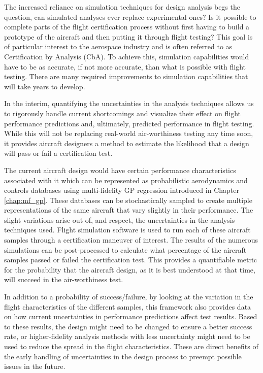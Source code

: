 The increased reliance on simulation techniques for design analysis begs the question, can simulated analyses ever replace experimental ones?
Is it possible to complete parts of the flight certification process without first having to build a prototype of the aircraft and then putting it through flight testing?
This goal is of particular interest to the aerospace industry and is often referred to as Certification by Analysis (CbA).
To achieve this, simulation capabilities would have to be as accurate, if not more accurate, than what is possible with flight testing.  
There are many required improvements to simulation capabilities \cite{slotnick_cfd_nodate} that will take years to develop.

In the interim, quantifying the uncertainties in the analysis techniques allows us to rigorously handle current shortcomings and visualize their effect on flight performance predictions and, ultimately, predicted performance in flight testing.
While this will not be replacing real-world air-worthiness testing any time soon, it provides aircraft designers a method to estimate the likelihood that a design will pass or fail a certification test. 

The current aircraft design would have certain performance characteristics associated with it which can be represented as probabilistic aerodynamics and controls databases using multi-fidelity GP regression introduced in Chapter \ref{chap:mf_gp}.
These databases can be stochastically sampled to create multiple representations of the same aircraft that vary slightly in their performance.
The slight variations arise out of, and respect, the uncertainties in the analysis techniques used. 
Flight simulation software is used to run each of these aircraft samples through a certification maneuver of interest.
The results of the numerous simulations can be post-processed to calculate what percentage of the aircraft samples passed or failed the certification test.
This provides a quantifiable metric for the probability that the aircraft design, as it is best understood at that time, will succeed in the air-worthiness test.

In addition to a probability of success/failure, by looking at the variation in the flight characteristics of the different samples, this framework also provides data on how current uncertainties in performance predictions affect test results.
Based to these results, the design might need to be changed to ensure a better success rate, or higher-fidelity analysis methods with less uncertainty might need to be used to reduce the spread in the flight characteristics. 
These are direct benefits of the early handling of uncertainties in the design process to preempt possible issues in the future. 


